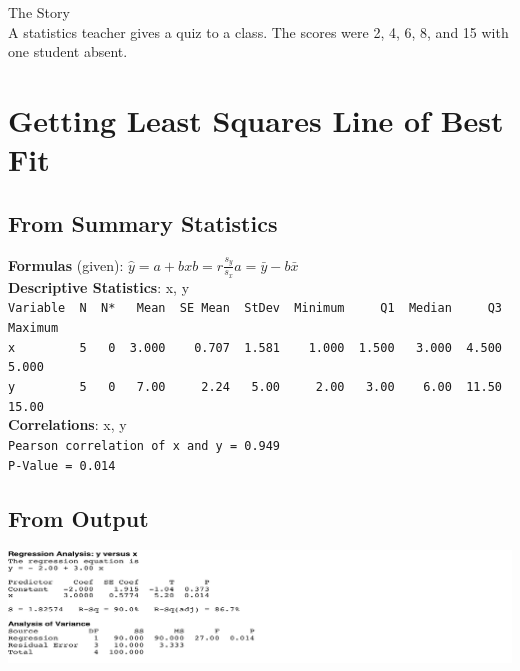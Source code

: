 \documentclass[9pt, oneside]{extarticle}   	%
\begin{document}
\newpage


The Story\\
A statistics teacher gives a quiz to a class. The scores were 2, 4, 6, 8, and 15 with one student absent.



\section{Getting Least Squares Line of Best Fit} %

\subsection{From Summary Statistics} %
\label{sub:from_summary_statistics}
{\bf Formulas} (given): $\hat{y} = a + bx$\quad\quad$b = r\frac{s_y}{s_x}$\quad\quad$a=\bar{y}-b\bar{x}$\\[.2in]
{\bf Descriptive Statistics}: x, y\\
\verb|Variable  N  N*   Mean  SE Mean  StDev  Minimum     Q1  Median     Q3  Maximum|\\
\verb|x         5   0  3.000    0.707  1.581    1.000  1.500   3.000  4.500    5.000|\\
\verb|y         5   0   7.00     2.24   5.00     2.00   3.00    6.00  11.50    15.00|\\[.1in]
{\bf Correlations}: x, y \\
\verb|Pearson correlation of x and y = 0.949|\\
\verb|P-Value = 0.014|\\[.5in]


\subsection{From Output} %
\label{sub:from_output}
\includegraphics[width=1\textwidth]{img/5_RegOut}\\[.25in]
\end{document}
